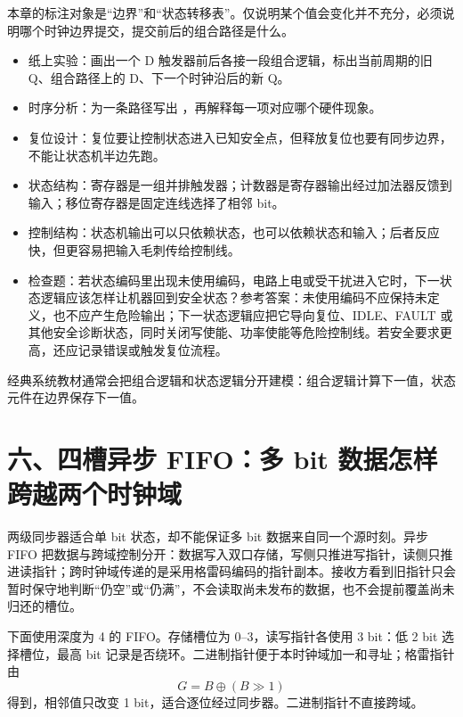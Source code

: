 \begin{classicnote}
本章的标注对象是“边界”和“状态转移表”。仅说明某个值会变化并不充分，必须说明哪个时钟边界提交，提交前后的组合路径是什么。

\begin{itemize}
\item 纸上实验：画出一个 D 触发器前后各接一段组合逻辑，标出当前周期的旧 Q、组合路径上的 D、下一个时钟沿后的新 Q。
\item 时序分析：为一条路径写出 ，再解释每一项对应哪个硬件现象。
\item 复位设计：复位要让控制状态进入已知安全点，但释放复位也要有同步边界，不能让状态机半边先跑。
\item 状态结构：寄存器是一组并排触发器；计数器是寄存器输出经过加法器反馈到输入；移位寄存器是固定连线选择了相邻 bit。
\item 控制结构：状态机输出可以只依赖状态，也可以依赖状态和输入；后者反应快，但更容易把输入毛刺传给控制线。
\item 检查题：若状态编码里出现未使用编码，电路上电或受干扰进入它时，下一状态逻辑应该怎样让机器回到安全状态？参考答案：未使用编码不应保持未定义，也不应产生危险输出；下一状态逻辑应把它导向复位、IDLE、FAULT 或其他安全诊断状态，同时关闭写使能、功率使能等危险控制线。若安全要求更高，还应记录错误或触发复位流程。
\end{itemize}

经典系统教材通常会把组合逻辑和状态逻辑分开建模：组合逻辑计算下一值，状态元件在边界保存下一值。
\end{classicnote}
\section{六、四槽异步 FIFO：多 bit 数据怎样跨越两个时钟域}

两级同步器适合单 bit 状态，却不能保证多 bit 数据来自同一个源时刻。异步 FIFO 把数据与跨域控制分开：数据写入双口存储，写侧只推进写指针，读侧只推进读指针；跨时钟域传递的是采用格雷码编码的指针副本。接收方看到旧指针只会暂时保守地判断“仍空”或“仍满”，不会读取尚未发布的数据，也不会提前覆盖尚未归还的槽位。

下面使用深度为 4 的 FIFO。存储槽位为 0--3，读写指针各使用 3 bit：低 2 bit 选择槽位，最高 bit 记录是否绕环。二进制指针便于本时钟域加一和寻址；格雷指针由
\[
  G=B\mathbin{\oplus}(B\gg1)
\]
得到，相邻值只改变 1 bit，适合逐位经过同步器。二进制指针不直接跨域。


